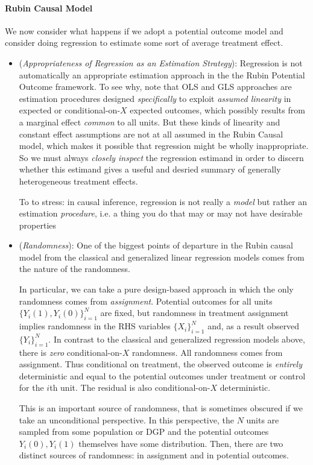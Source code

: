 \documentclass[12pt]{article}
\theoremstyle{plain}
\theoremstyle{definition}
\theoremstyle{remark}
\begin{document}
\paragraph{Rubin Causal Model}
We now consider what happens if we adopt a potential outcome model and
consider doing regression to estimate some sort of average treatment
effect.
\begin{itemize}
  \item
    (\emph{Appropriateness of Regression as an Estimation Strategy}):
    Regression is not automatically an appropriate estimation approach
    in the the Rubin Potential Outcome framework.
    To see why, note that OLS and GLS approaches are estimation procedures
    designed \emph{specifically} to exploit \emph{assumed linearity} in
    expected or conditional-on-$X$ expected outcomes, which possibly results
    from a marginal effect \emph{common} to all units.
    But these kinds of linearity and constant effect assumptions are not at
    all assumed in the Rubin Causal model, which makes it possible that
    regression might be wholly inappropriate.
    So we must always \emph{closely inspect} the regression estimand in
    order to discern whether this estimand gives a useful and desried
    summary of generally heterogeneous treatment effects.

    To to stress:
    in causal inference, regression is not really a \emph{model} but
    rather an estimation \emph{procedure}, i.e. a thing you do that may
    or may not have desirable properties

  \item
    (\emph{Randomness}):
    One of the biggest points of departure in the Rubin causal model
    from the classical and generalized linear regression models comes
    from the nature of the randomness.

    In particular, we can take a pure design-based approach in which
    the only randomness comes from \emph{assignment}.
    Potential outcomes for all units $\{Y_i(1),Y_i(0)\}_{i=1}^N$ are
    fixed, but randomness in treatment assignment implies randomness in
    the RHS variables $\{X_i\}_{i=1}^N$ and, as a result observed
    $\{Y_i\}_{i=1}^N$.
    In contrast to the classical and generalized regression models
    above, there is \emph{zero} conditional-on-$X$ randomness.
    All randomness comes from assignment.
    Thus conditional on treatment, the observed outcome is
    \emph{entirely} deterministic and equal to the potential outcomes
    under treatment or control for the $i$th unit.
    The residual is also conditional-on-$X$ deterministic.

    This is an important source of randomness, that is sometimes
    obscured if we take an unconditional perspective.
    In this perspective, the $N$ units are sampled from some population
    or DGP and the potential outcomes $Y_i(0),Y_i(1)$ themselves have
    some distribution.
    Then, there are two distinct sources of randomness:
    in assignment and in potential outcomes.
\end{itemize}
\end{document}
